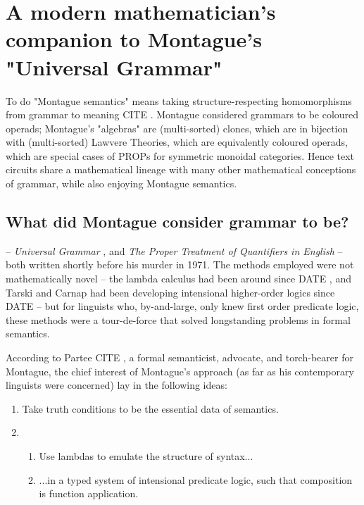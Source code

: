 \section{A modern mathematician's companion to Montague's "Universal Grammar"}

 To do "Montague semantics" means taking structure-respecting homomorphisms from grammar to meaning \bR CITE \e. Montague considered grammars to be coloured operads; Montague's "algebras" are (multi-sorted) clones, which are in bijection with (multi-sorted) Lawvere Theories, which are equivalently coloured operads, which are special cases of PROPs for symmetric monoidal categories. Hence text circuits share a mathematical lineage with many other mathematical conceptions of grammar, while also enjoying Montague semantics.

\subsection{What did Montague consider grammar to be?}\label{sec:monty}

 -- \emph{Universal Grammar} \citep{montague1970universal}, and \emph{The Proper Treatment of Quantifiers in English} \citep{montague1973proper} -- both written shortly before his murder in 1971. The methods employed were not mathematically novel -- the lambda calculus had been around since \bR DATE \e, and Tarski and Carnap had been developing intensional higher-order logics since \bR DATE \e -- but for linguists who, by-and-large, only knew first order predicate logic, these methods were a tour-de-force that solved longstanding problems in formal semantics.

 According to Partee \bR CITE \e, a formal semanticist, advocate, and torch-bearer for Montague, the chief interest of Montague's approach (as far as his contemporary linguists were concerned) lay in the following ideas:

\begin{enumerate}
\item{Take truth conditions to be the essential data of semantics.}
\item{
\begin{enumerate}
\item{Use lambdas to emulate the structure of syntax...}
\item{...in a typed system of intensional predicate logic, such that composition is function application.}
\end{enumerate}}
\end{enumerate}

